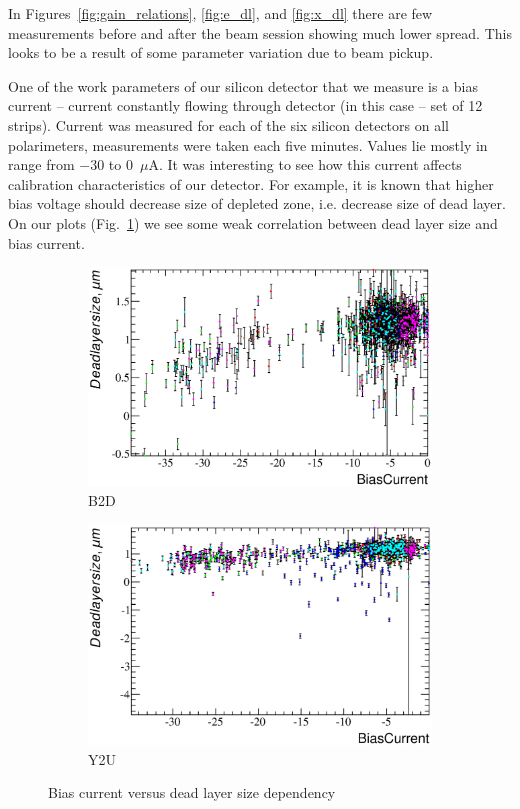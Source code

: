 \documentclass[a4paper,12pt]{article}
\begin{document}
In Figures~\ref{fig:gain_relations}, \ref{fig:e_dl}, and \ref{fig:x_dl} there
are few measurements before and after the beam session showing much lower
spread. This looks to be a result of some parameter variation due to beam
pickup.

One of the work parameters of our silicon detector that we measure is a bias
current -- current constantly flowing through detector (in this case -- set of
12 strips). Current was measured for each of the six silicon detectors on all
polarimeters, measurements were taken each five minutes. Values lie mostly in
range from $-30$ to $0$~$\mu\text{A}$. It was interesting to see how this current
affects calibration characteristics of our detector. For example, it is known
that higher bias voltage should decrease size of depleted zone, i.e. decrease
size of dead layer. On our plots (Fig.~\ref{fig:bc_vs_xdl}) we see some weak
correlation between dead layer size and bias current.

\newcommand\bcvsxdllabel{Bias current versus dead layer size dependency}
\begin{figure}[p]
\begin{subfigure}[t]{0.5\textwidth}
\includegraphics[width=\textwidth]{gfx/run13_alpha_study/B2D/c_hBiasCurrent_DeadLayerSize.eps}
\caption{B2D}
\end{subfigure}
%
\begin{subfigure}[t]{0.5\textwidth}
\includegraphics[width=\textwidth]{gfx/run13_alpha_study/Y2U/c_hBiasCurrent_DeadLayerSize.eps}
\caption{Y2U}
\end{subfigure}
\caption{\bcvsxdllabel}
\label{fig:bc_vs_xdl}
\end{figure}
\end{document}
